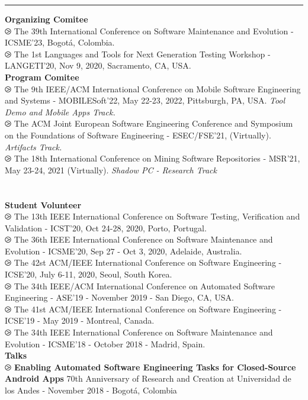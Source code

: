\documentclass[letterpaper,11pt,oneside]{article}
\begin{document}
\hrule 
\normalsize
\vspace{2ex}
\noindent \textbf{Organizing Comitee} \\
$\ogreaterthan$ The 39th International Conference on Software Maintenance and Evolution - ICSME'23, Bogotá, Colombia. \\
$\ogreaterthan$ The 1st Languages and Tools for Next Generation Testing Workshop - LANGETI'20, Nov 9, 2020, Sacramento, CA, USA. \\
\noindent \textbf{Program Comitee} \\
$\ogreaterthan$ The 9th IEEE/ACM International Conference on Mobile Software Engineering and Systems - MOBILESoft'22, May 22-23, 2022, Pittsburgh, PA, USA. \textit{Tool Demo and Mobile Apps Track.} \\
$\ogreaterthan$ The ACM Joint European Software Engineering Conference and Symposium on the Foundations of Software Engineering - ESEC/FSE'21, (Virtually). \textit{Artifacts Track.} \\
$\ogreaterthan$ The 18th International Conference on Mining Software Repositories - MSR'21, May 23-24, 2021 (Virtually). \textit{Shadow PC - Research Track} \\ \\ \\
\noindent \textbf{Student Volunteer} \\
$\ogreaterthan$ The 13th IEEE International Conference on Software Testing, Verification and Validation - ICST'20, Oct 24-28, 2020, Porto, Portugal. \\
$\ogreaterthan$ The 36th IEEE International Conference on Software Maintenance and Evolution - ICSME'20, Sep 27 - Oct 3, 2020, Adelaide, Australia. \\
$\ogreaterthan$ The 42st ACM/IEEE International Conference on Software Engineering - ICSE'20, July 6-11, 2020, Seoul, South Korea. \\
$\ogreaterthan$ The 34th IEEE/ACM International Conference on Automated Software Engineering - ASE'19 - November 2019 - San Diego, CA, USA. \\
$\ogreaterthan$ The 41st ACM/IEEE International Conference on Software Engineering - ICSE'19 - May 2019 - Montreal, Canada. \\
$\ogreaterthan$ The 34th IEEE International Conference on Software Maintenance and Evolution - ICSME'18 - October 2018 - Madrid, Spain. \\
\noindent \textbf{Talks} \\
$\ogreaterthan$ \textbf{Enabling Automated Software Engineering Tasks for Closed-Source Android Apps} 70th Anniversary of Research and Creation at Universidad de los Andes - November 2018 - Bogot\'a, Colombia
\end{document}

